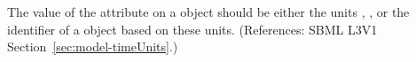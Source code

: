 The value of the attribute  on a \Model object should be
either the units , , or the identifier of a
\UnitDefinition object based on these units.  (References: SBML L3V1
Section~\ref{sec:model-timeUnits}.)
